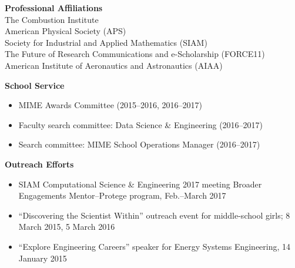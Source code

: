 \documentclass[margin,line,11pt]{res}
\begin{document}
\begin{resume}
\textbf{Professional Affiliations} \\
The Combustion Institute \\
American Physical Society (APS) \\
Society for Industrial and Applied Mathematics (SIAM) \\
The Future of Research Communications and e-Scholarship (FORCE11) \\
American Institute of Aeronautics and Astronautics (AIAA)

\textbf{School Service}
\begin{itemize}[leftmargin=*]
    \item MIME Awards Committee (2015--2016, 2016--2017)
    \item Faculty search committee: Data Science \& Engineering (2016--2017)
    \item Search committee: MIME School Operations Manager (2016--2017)
\end{itemize}

\textbf{Outreach Efforts}
\begin{itemize}[leftmargin=*]
    \item SIAM Computational Science \& Engineering 2017 meeting Broader Engagements Mentor--Protege program, Feb.--March 2017
    \item ``Discovering the Scientist Within'' outreach event for middle-school girls; 8 March 2015, 5 March 2016
    \item ``Explore Engineering Careers'' speaker for Energy Systems Engineering, 14 January 2015
\end{itemize}


\end{resume}
\end{document}
